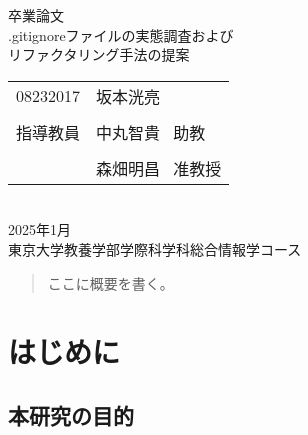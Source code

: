 \documentclass[xelatex,ja=standard,fontsize=10.5pt]{bxjsreport}
\begin{document}
\begin{titlepage}
    \begin{center}
        \vspace*{\fill}
        \vspace{40pt}
        {\Large 卒業論文}
        \vspace{20pt} \\
        {\huge .gitignoreファイルの実態調査および \\\vspace{10pt} リファクタリング手法の提案} \\
        \vspace{160pt}
        \begin{tabular}{rl}
            {\Large 08232017} & {\LARGE 坂本洸亮}       \\
            \vspace{10pt}                           \\
            {\Large 指導教員}     & {\Large 中丸智貴 \ 助教}  \\
            \vspace{-10pt}                          \\
                              & {\Large 森畑明昌 \ 准教授}
        \end{tabular}
        \vspace{60pt} \\
        {\Large 2025年1月}
        \vspace{60pt} \\
        {\Large 東京大学教養学部学際科学科総合情報学コース}
        \vspace*{\fill}
    \end{center}
\end{titlepage}

\begin{abstract}
    ここに概要を書く。
\end{abstract}

\setcounter{tocdepth}{2}
\tableofcontents
\thispagestyle{empty}
\restoregeometry

\mainmatter

\pagestyle{headings}

%
\chapter{はじめに}

\section{本研究の目的}
\end{document}
